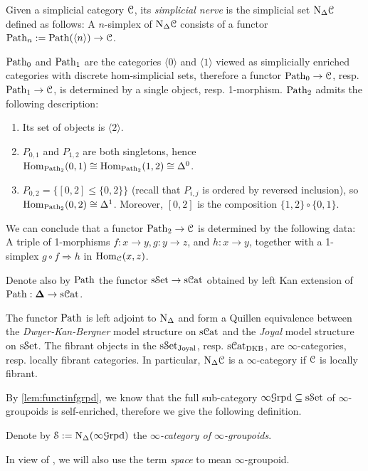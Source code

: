 \documentclass[10pt]{amsart}
\numberwithin{equation}{section}
\begin{document}
\begin{definition}
  Given a simplicial category $\mathcal{C}$, its \emph{simplicial nerve} is the simplicial set $\mathrm{N}_\Delta\mathcal{C}$ defined as follows:  A $n$-simplex of $\mathrm{N}_\Delta\mathcal{C}$ consists of a functor $\mathrm{Path}_n:=\mathrm{Path}(\langle n\rangle)\to\mathcal{C}$. 
\end{definition}
\begin{remark}$\mathrm{Path}_0$ and $\mathrm{Path}_1$ are the categories $\langle0\rangle$ and $\langle 1\rangle$ viewed as simplicially enriched categories with discrete hom-simplicial sets, therefore a functor $\mathrm{Path}_0\to\mathcal{C}$, resp. $\mathrm{Path}_1\to\mathcal{C}$, is determined by a single object, resp. 1-morphism. $\mathrm{Path}_2$ admits the following description:
\begin{enumerate}
    \item Its set of objects is $\langle2\rangle$.
    \item $P_{0,1}$ and $P_{1,2}$ are both singletons, hence $\mathrm{Hom}_{\mathrm{Path}_2}(0,1)\cong\mathrm{Hom}_{\mathrm{Path}_2}(1,2)\cong\Delta^0$. 
    \item $P_{0,2}=\{[0,2]\leq\{0,2\}\}$ (recall that $P_{i,j}$ is ordered by reversed inclusion), so $\mathrm{Hom}_{\mathrm{Path}_2}(0,2)\cong\Delta^1$. Moreover, $[0,2]$ is the composition $\{1,2\}\circ\{0,1\}$.  
  \end{enumerate}
  We can conclude that a functor $\mathrm{Path}_2\to\mathcal{C}$ is determined by the following data: A triple of 1-morphisms $f:x\to y,g:y\to z$, and $h:x\to y$, together with a 1-simplex $g\circ f\Rightarrow h$ in $\mathrm{Hom}_{\mathcal{C}}(x,z)$. 
\end{remark}
\begin{definition}
  Denote also by $\mathrm{Path}$ the functor $\mathrm{s}\mathcal{S}\mathrm{et}\to\mathrm{s}\mathcal{C}\mathrm{at}$ obtained by left Kan extension of $\mathrm{Path}:\bm{\Delta}\to\mathrm{s}\mathcal{C}\mathrm{at}$. 
\end{definition}
\begin{theorem}
  The functor $\mathrm{Path}$ is left adjoint to $\mathrm{N}_\Delta$ and form a Quillen equivalence between the \emph{Dwyer-Kan-Bergner} model structure on $\mathrm{s}\mathcal{C}\mathrm{at}$ and the \emph{Joyal} model structure on $\mathrm{s}\mathcal{S}\mathrm{et}$. The fibrant objects in the $\mathrm{s}\mathcal{S}\mathrm{et}_\mathrm{Joyal}$, resp. $\mathrm{s}\mathcal{C}\mathrm{at}_\mathrm{DKB}$, are $\infty$-categories, resp. locally fibrant categories. In particular, $\mathrm{N}_\Delta\mathcal{C}$ is a $\infty$-category if $\mathcal{C}$ is locally fibrant.
\end{theorem}
By \cref{lem:functinfgrpd}, we know that the full sub-category $\infty\mathcal{G}\mathrm{rpd}\subseteq\mathrm{s}\mathcal{S}\mathrm{et}$ of $\infty$-groupoids is self-enriched, therefore we give the following definition.
\begin{definition}
  Denote by $\mathcal{S}:=\mathrm{N}_\Delta(\infty\mathcal{G}\mathrm{rpd})$ the \emph{$\infty$-category of $\infty$-groupoids}.
\end{definition}
\begin{remark}
  In view of \cite{kerodon2026topspc}, we will also use the term \emph{space} to mean $\infty$-groupoid. 
\end{remark}
\end{document}
